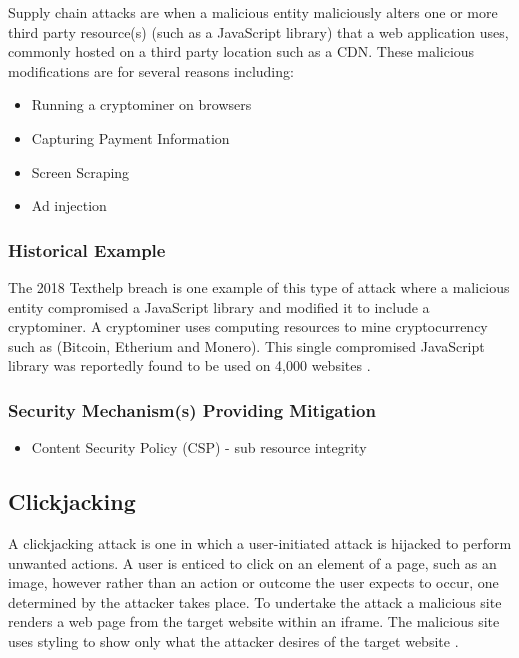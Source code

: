 \documentclass{mscreport}
\begin{document}
Supply chain attacks are when a malicious entity maliciously alters one or more third party resource(s) (such as a JavaScript library) that a web application uses, commonly hosted on a third party location such as a CDN. These malicious modifications are for several reasons including:

\begin{itemize}
	\setlength\itemsep{0.1em}
	\item Running a cryptominer \cite{Tekiner2021-sq} on browsers
	\item Capturing Payment Information
	\item Screen Scraping
	\item Ad injection
\end{itemize}

\subsubsection{Historical Example}
The 2018 Texthelp breach is one example of this type of attack where a malicious entity compromised a JavaScript library and modified it to include a cryptominer. A cryptominer uses computing resources to mine cryptocurrency such as (Bitcoin, Etherium and Monero). This single compromised JavaScript library was reportedly found to be used on 4,000 websites \cite{Billman2018-sq}.

\subsubsection{Security Mechanism(s) Providing Mitigation}

\begin{itemize}
	\setlength\itemsep{0.1em}
	\item Content Security Policy (CSP) - sub resource integrity
\end{itemize}

\subsection{Clickjacking}

A clickjacking attack is one in which a user-initiated attack is hijacked to perform unwanted actions. A user is enticed to click on an element of a page, such as an image, however rather than an action or outcome the user expects to occur, one determined by the attacker takes place. To undertake the attack a malicious site renders a web page from the target website within an iframe. The malicious site uses styling to show only what the attacker desires of the target website \cite{Jamwal2018-tz}.
\end{document}
